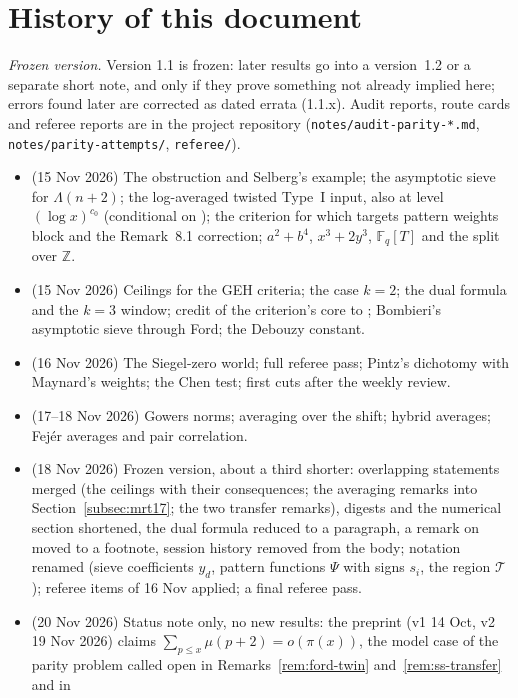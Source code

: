 \documentclass[11pt]{amsart}
\theoremstyle{definition}
\theoremstyle{remark}
\begin{document}
\section{History of this document}\label{app:history}
\emph{Frozen version.} Version 1.1 is frozen: later results go into a
version~1.2 or a separate short note, and only if they prove something not
already implied here; errors found later are corrected as dated errata
(1.1.x). Audit reports, route cards and referee reports are in the project
repository (\texttt{notes/audit-parity-*.md}, \texttt{notes/parity-attempts/},
\texttt{referee/}).
\begin{itemize}
\item[0.1--0.5] (15 Nov 2026) The obstruction and Selberg's example; the
  asymptotic sieve for $\Lambda(n+2)$; the log-averaged twisted Type~I input,
  also at level $(\log x)^{c_0}$ (conditional on \cite{TT25}); the criterion for
  which targets pattern weights block and the Remark~8.1 correction;
  $a^2+b^4$, $x^3+2y^3$, $\mathbb F_q[T]$ and the split over $\mathbb Z$.
\item[0.6--0.9] (15 Nov 2026) Ceilings for the GEH criteria; the case $k=2$;
  the dual formula and the $k=3$ window; credit of the criterion's core to
  \cite{Tao14b}; Bombieri's asymptotic sieve through Ford; the Debouzy constant.
\item[0.10--0.12] (16 Nov 2026) The Siegel-zero world; full referee pass;
  Pintz's dichotomy with Maynard's weights; the Chen test; first cuts after the
  weekly review.
\item[0.13--0.16] (17--18 Nov 2026) Gowers norms; averaging over the shift; hybrid
  averages; Fej\'er averages and pair correlation.
\item[1.0] (18 Nov 2026) Frozen version, about a third shorter: overlapping
  statements merged (the ceilings with their consequences; the averaging
  remarks into Section~\ref{subsec:mrt17}; the two transfer remarks), digests
  and the numerical section shortened, the dual formula reduced to a
  paragraph, a remark on \cite[Proposition~6.5]{PM8b} moved to a footnote,
  session history removed from the body; notation renamed (sieve coefficients
  $y_d$, pattern functions $\Psi$ with signs $s_i$, the region $\mathcal T$);
  referee items of 16 Nov applied; a final referee pass.
\item[1.0.1] (20 Nov 2026) Status note only, no new results: the preprint
  \cite{LWW26} (v1 14 Oct, v2 19 Nov 2026) claims
  $\sum_{p\le x}\mu(p+2)=o(\pi(x))$, the model case of the parity problem
  called open in Remarks~\ref{rem:ford-twin} and~\ref{rem:ss-transfer} and in

\end{itemize}
\end{document}
